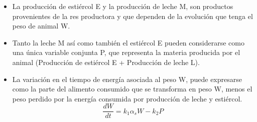 \begin{itemize}
        
    \item La producción de estiércol E y la producción de leche M, son productos provenientes de la res productora y que dependen de la evolución que tenga el peso de animal W.

    \item Tanto la leche M así como también el estiércol E pueden considerarse como una única variable conjunta P, que representa la materia producida por el animal (Producción de estiércol E + Producción de leche L).
    
    \item La variación en el tiempo de energía asociada al peso W, puede expresarse como 
    la parte del alimento consumido que se transforma en peso W, menos el peso perdido por la energía consumida por producción de leche y estiércol.
    \begin{equation} \label{modwp1}
        \frac{dW}{dt} = k_{1}\alpha_{s}W - k_{2}P
    \end{equation}
    

\end{itemize}
